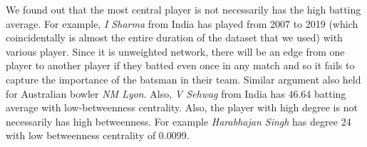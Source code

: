 \documentclass{article}
\begin{document}
We found out that the most central player is not necessarily has the high batting average. For example, \textit{I Sharma} from India has played from 2007 to 2019 (which coincidentally is almost the entire duration of the dataset that we used) with various player. Since it is unweighted network, there will be an edge from one player to another player if they batted even once in any match and so it fails to capture the importance of the batsman in their team. Similar argument also held for Australian bowler \textit{NM Lyon}. Also, \textit{V Sehwag} from India has 46.64 batting average with low-betweenness centrality. Also, the player with high degree is not necessarily has high betweenness. For example \textit{Harabhajan Singh} has degree 24 with low betweenness centrality of 0.0099.
\begin{table}[!h]
\end{table}
\end{document}
